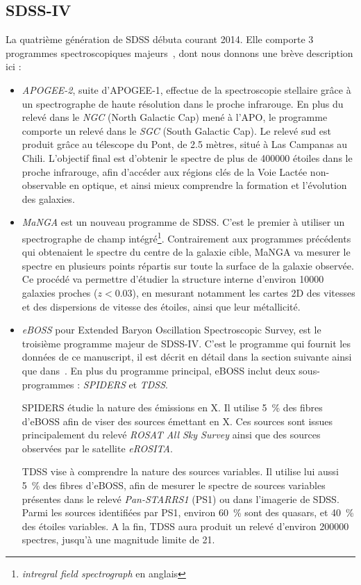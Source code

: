 \subsection{SDSS-IV}

La quatrième génération de SDSS débuta courant 2014. Elle comporte 3 programmes spectroscopiques majeurs~\cite{Blanton2017}, dont nous donnons une brève description ici :
\begin{itemize}
\item \emph{APOGEE-2}, suite d'APOGEE-1, effectue de la spectroscopie stellaire grâce à un spectrographe de haute résolution dans le proche infrarouge. En plus du relevé dans le \emph{NGC} (North Galactic Cap) mené à l'APO, le programme comporte un relevé dans le \emph{SGC} (South Galactic Cap). Le relevé sud est produit grâce au télescope du Pont, de \num{2,5} mètres, situé à Las Campanas au Chili. L'objectif final est d'obtenir le spectre de plus de \num{400000} étoiles dans le proche infrarouge, afin d'accéder aux régions clés de la Voie Lactée non-observable en optique, et ainsi mieux comprendre la formation et l'évolution des galaxies.
\item \emph{MaNGA} est un nouveau programme de SDSS. C'est le premier à utiliser un spectrographe de champ intégré\footnote{\emph{intregral field spectrograph} en anglais}. Contrairement aux programmes précédents qui obtenaient le spectre du centre de la galaxie cible, MaNGA va mesurer le spectre en plusieurs points répartis sur toute la surface de la galaxie observée. Ce procédé va permettre d'étudier la structure interne d'environ \num{10000} galaxies proches ($z < \num{0,03}$), en mesurant notamment les cartes 2D des vitesses et des dispersions de vitesse des étoiles, ainsi que leur  métallicité.
\item \emph{eBOSS} pour Extended Baryon Oscillation Spectroscopic Survey, est le troisième programme majeur de SDSS-IV. C'est le programme qui fournit les données de ce manuscript, il est décrit en détail dans la section suivante ainsi que dans~\cite{Dawson2015}. En plus du programme principal, eBOSS inclut deux sous-programmes : \emph{SPIDERS} et \emph{TDSS}.
  
  SPIDERS étudie la nature des émissions en X. Il utilise \SI{5}{\percent} des fibres d'eBOSS afin de viser des sources émettant en X. Ces sources sont issues principalement du relevé \emph{ROSAT All Sky Survey} ainsi que des sources observées par le satellite \emph{eROSITA}.

  TDSS vise à comprendre la nature des sources variables. Il utilise lui aussi \SI{5}{\percent} des fibres d'eBOSS, afin de mesurer le spectre de sources variables présentes dans le relevé \emph{Pan-STARRS1} (PS1) ou dans l'imagerie de SDSS. Parmi les sources identifiées par PS1, environ \SI{60}{\percent} sont des quasars, et \SI{40}{\percent} des étoiles variables. A la fin, TDSS aura produit un relevé d'environ \num{200000} spectres, jusqu'à une magnitude limite de 21.
\end{itemize}



